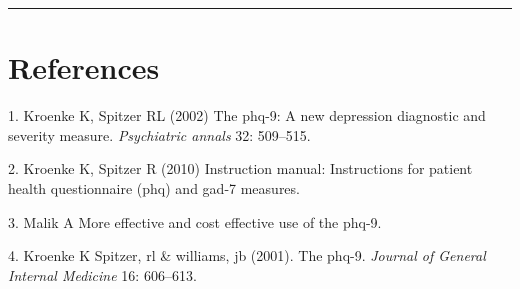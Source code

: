 \documentclass[12pt,]{article}
\begin{document}
\begin{center}\rule{0.5\linewidth}{\linethickness}\end{center}

\hypertarget{references}{%
\section{References}\label{references}}



\hypertarget{refs}{}
\leavevmode\hypertarget{ref-kroenke2002phq}{}%
1. Kroenke K, Spitzer RL (2002) The phq-9: A new depression diagnostic
and severity measure. \emph{Psychiatric annals} 32: 509--515.

\leavevmode\hypertarget{ref-kroenke2010instruction}{}%
2. Kroenke K, Spitzer R (2010) Instruction manual: Instructions for
patient health questionnaire (phq) and gad-7 measures.

\leavevmode\hypertarget{ref-MalikMoreEf}{}%
3. Malik A More effective and cost effective use of the phq-9.

\leavevmode\hypertarget{ref-kroenke16spitzer}{}%
4. Kroenke K Spitzer, rl \& williams, jb (2001). The phq-9.
\emph{Journal of General Internal Medicine} 16: 606--613.
\end{document}
